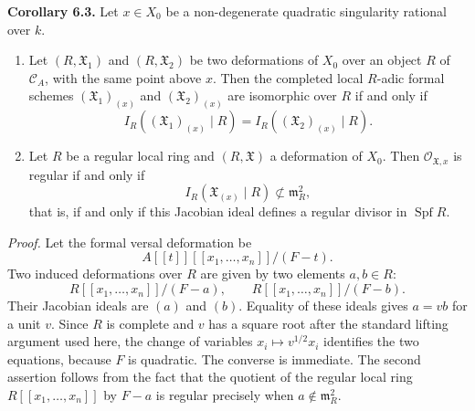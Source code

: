 \documentclass[11pt]{article}
\providecommand{\Spf}{\operatorname{Spf}}
\providecommand{\Oo}{\mathcal O}
\begin{document}
\textbf{Corollary 6.3.}  Let \(x\in X_0\) be a non-degenerate quadratic singularity rational over \(k\).
\begin{enumerate}[label=(\arabic*)]
\item Let \((R,\mathfrak X_1)\) and \((R,\mathfrak X_2)\) be two deformations of \(X_0\) over an object \(R\) of \(\mathcal C_A\), with the same point above \(x\).  Then the completed local \(R\)-adic formal schemes \((\mathfrak X_1)_{(x)}\) and \((\mathfrak X_2)_{(x)}\) are isomorphic over \(R\) if and only if
\[
        I_R((\mathfrak X_1)_{(x)}\mid R)
        =
        I_R((\mathfrak X_2)_{(x)}\mid R).
\]
\item Let \(R\) be a regular local ring and \((R,\mathfrak X)\) a deformation of \(X_0\).  Then \(\Oo_{\mathfrak X,x}\) is regular if and only if
\[
        I_R(\mathfrak X_{(x)}\mid R)\not\subset \mathfrak m_R^2,
\]
that is, if and only if this Jacobian ideal defines a regular divisor in \(\Spf R\).
\end{enumerate}

\emph{Proof.}  Let the formal versal deformation be
\[
        A[[t]][[x_1,\ldots,x_n]]/(F-t).
\]
Two induced deformations over \(R\) are given by two elements \(a,b\in R\):
\[
        R[[x_1,\ldots,x_n]]/(F-a),
        \qquad
        R[[x_1,\ldots,x_n]]/(F-b).
\]
Their Jacobian ideals are \((a)\) and \((b)\).  Equality of these ideals gives \(a=vb\) for a unit \(v\).  Since \(R\) is complete and \(v\) has a square root after the standard lifting argument used here, the change of variables \(x_i\mapsto v^{1/2}x_i\) identifies the two equations, because \(F\) is quadratic.  The converse is immediate.  The second assertion follows from the fact that the quotient of the regular local ring \(R[[x_1,\ldots,x_n]]\) by \(F-a\) is regular precisely when \(a\notin\mathfrak m_R^2\).
\end{document}
